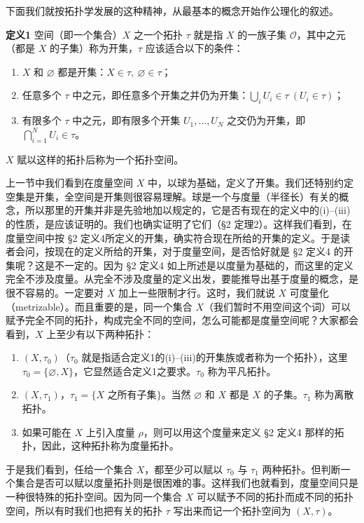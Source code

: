 下面我们就按拓扑学发展的这种精神，从最基本的概念开始作公理化的叙述。

\noindent\textbf{定义1}\quad
空间（即一个集合）$X$ 之一个拓扑 $\tau$ 就是指 $X$ 的一族子集 $\mathcal O$，其中之元（都是 $X$ 的子集）称为开集，$\tau$ 应该适合以下的条件：
\begin{enumerate}[label=(\roman*)]
\item $X$ 和 $\varnothing$ 都是开集：$X\in\tau,\ \varnothing\in\tau$；
\item 任意多个 $\tau$ 中之元，即任意多个开集之并仍为开集：$\bigcup_iU_i\in\tau\ (U_i\in\tau)$；
\item 有限多个 $\tau$ 中之元，即有限多个开集 $U_1,\ldots,U_N$ 之交仍为开集，即 $\bigcap_{i=1}^NU_i\in\tau$。
\end{enumerate}
$X$ 赋以这样的拓扑后称为一个拓扑空间。

上一节中我们看到在度量空间 $X$ 中，以球为基础，定义了开集。我们还特别约定空集是开集，全空间是开集则很容易理解。球是一个与度量（半径长）有关的概念，所以那里的开集并非是先验地加以规定的，它是否有现在的定义中的(i)--(iii)的性质，是应该证明的。我们也确实证明了它们（\S2 定理2）。这样我们看到，在度量空间中按 \S2 定义4所定义的开集，确实符合现在所给的开集的定义。于是读者会问，按现在的定义所给的开集，对于度量空间，是否恰好就是 \S2 定义4 的开集呢？这是不一定的。因为 \S2 定义4 如上所述是以度量为基础的，而这里的定义完全不涉及度量。从完全不涉及度量的定义出发，要能推导出基于度量的概念，是很不容易的。一定要对 $X$ 加上一些限制才行。这时，我们就说 $X$ 可度量化（metrizable）。而且重要的是，同一个集合 $X$（我们暂时不用空间这个词）可以赋予完全不同的拓扑，构成完全不同的空间，怎么可能都是度量空间呢？大家都会看到，$X$ 上至少有以下两种拓扑：

\begin{enumerate}[label=\roman*)]
\item $(X,\tau_0)$（$\tau_0$ 就是指适合定义1的(i)--(iii)的开集族或者称为一个拓扑），这里 $\tau_0=\{\varnothing,X\}$，它显然适合定义1之要求。$\tau_0$ 称为平凡拓扑。
\item $(X,\tau_1)$，$\tau_1=\{X\text{ 之所有子集}\}$。当然 $\varnothing$ 和 $X$ 都是 $X$ 的子集。$\tau_1$ 称为离散拓扑。
\item 如果可能在 $X$ 上引入度量 $\rho$，则可以用这个度量来定义 \S2 定义4 那样的拓扑，因此，这种拓扑称为度量拓扑。
\end{enumerate}

于是我们看到，任给一个集合 $X$，都至少可以赋以 $\tau_0$ 与 $\tau_1$ 两种拓扑。但判断一个集合是否可以赋以度量拓扑则是很困难的事。这样我们也就看到，度量空间只是一种很特殊的拓扑空间。因为同一个集合 $X$ 可以赋予不同的拓扑而成不同的拓扑空间，所以有时我们也把有关的拓扑 $\tau$ 写出来而记一个拓扑空间为 $(X,\tau)$。

